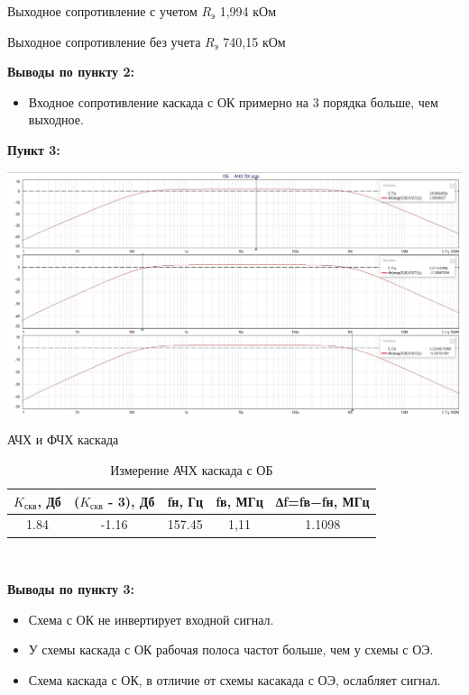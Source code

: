 \documentclass[a4paper,14pt]{extarticle}
\begin{document}
    Выходное сопротивление с учетом $R_{\text{э}}$ 1,994 кОм

    Выходное сопротивление без учета $R_{\text{э}}$ 740,15 кОм

    \textbf{Выводы по пункту 2:}
    \vspace{-6ex}
    \begin{singlespace}
        \begin{itemize}
            \item Входное сопротивление каскада с ОК примерно на 3 порядка больше, чем выходное.
        \end{itemize}
    \end{singlespace}

    \newpage 
    \textbf{Пункт 3:}
    \begin{center}
        \includegraphics[scale=0.25]{3.jpg}
    \end{center}
   \begin{center}
        АЧХ и ФЧХ каскада
    \end{center}

    \begin{table}[ht]
        \begin{center}
            \caption{Измерение АЧХ каскада с ОБ}
            \begin{tabular}{ |c|c|c|c|c| }
                \hline
                $K_{\text{скв}}$, Дб & ($K_{\text{скв}}$ - 3), Дб&fн, Гц & fв, МГц & ∆f=fв−fн, МГц \\
                \hline 
                1.84 & -1.16 & 157.45 & 1,11 & 1.1098 \\
                \hline
            \end{tabular}\\
        \end{center}
    \end{table}
    \textbf{Выводы по пункту 3:}
    \vspace{-6ex}
    \begin{singlespace}
        \begin{itemize}
            \item Схема с ОК не инвертирует входной сигнал.
            \item У схемы каскада с ОК рабочая полоса частот больше, чем у схемы с ОЭ.
            \item Схема каскада с ОК, в отличие от схемы касакада с ОЭ, ослабляет сигнал. 
        \end{itemize}
    \end{singlespace}
\end{document}

